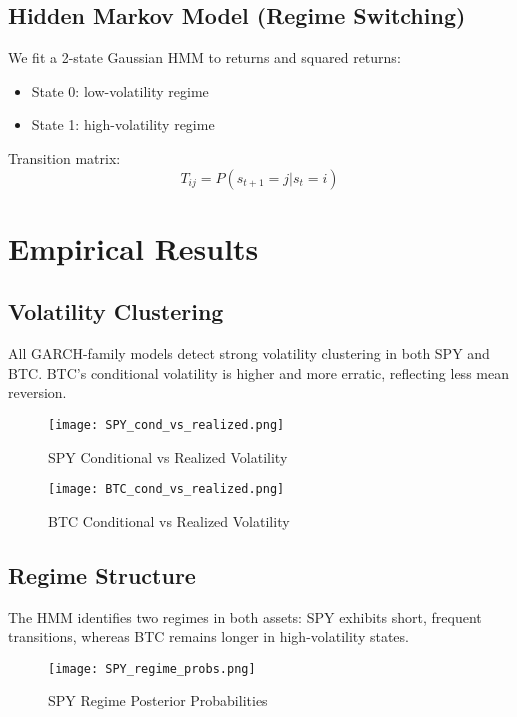 \documentclass[12pt]{article}
\begin{document}
\FloatBarrier
\subsection{Hidden Markov Model (Regime Switching)}
We fit a 2-state Gaussian HMM to returns and squared returns:
\begin{itemize}
    \item State 0: low-volatility regime
    \item State 1: high-volatility regime
\end{itemize}

Transition matrix:
\begin{equation}
T_{ij} = P(s_{t+1}=j | s_t=i)
\end{equation}

\FloatBarrier
\section{Empirical Results}
\subsection{Volatility Clustering}
All GARCH-family models detect strong volatility clustering in both SPY and BTC. BTC’s conditional volatility is higher and more erratic, reflecting less mean reversion.

\begin{figure}[h!]
\centering
\texttt{[image: SPY\_cond\_vs\_realized.png]}
\caption{SPY Conditional vs Realized Volatility}
\end{figure}

\begin{figure}[h!]
\centering
\texttt{[image: BTC\_cond\_vs\_realized.png]}
\caption{BTC Conditional vs Realized Volatility}
\end{figure}

\FloatBarrier
\subsection{Regime Structure}
The HMM identifies two regimes in both assets: SPY exhibits short, frequent transitions, whereas BTC remains longer in high-volatility states.

\begin{figure}[h!]
\centering
\texttt{[image: SPY\_regime\_probs.png]}
\caption{SPY Regime Posterior Probabilities}
\end{figure}
\end{document}
